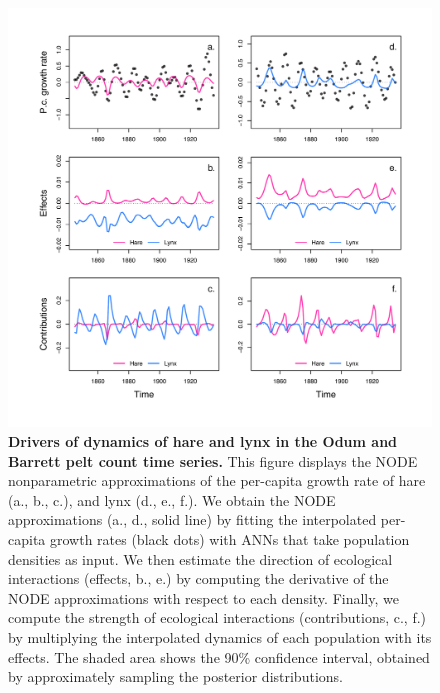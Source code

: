 \documentclass[11pt, oneside]{article}
\begin{document}
\newpage
\begin{figure}[H]
\begin{center}
\includegraphics[width=\linewidth,page=7]{figure_7.png}
\caption{
    \textbf{Drivers of dynamics of hare and lynx in the Odum and Barrett pelt count time series.}
    This figure displays the NODE nonparametric approximations of the per-capita growth rate of hare (a., b., c.), and lynx (d., e., f.).
    We obtain the NODE approximations (a., d., solid line) by fitting the interpolated per-capita growth rates (black dots) with ANNs that take population densities as input.
    We then estimate the direction of ecological interactions (effects, b., e.) by computing the derivative of the NODE approximations with respect to each density.
    Finally, we compute the strength of ecological interactions (contributions, c., f.) by multiplying the interpolated dynamics of each population with its effects.
    The shaded area shows the 90\% confidence interval, obtained by approximately sampling the posterior distributions. 
}
\end{center}
\end{figure}
\newpage
\end{document}
